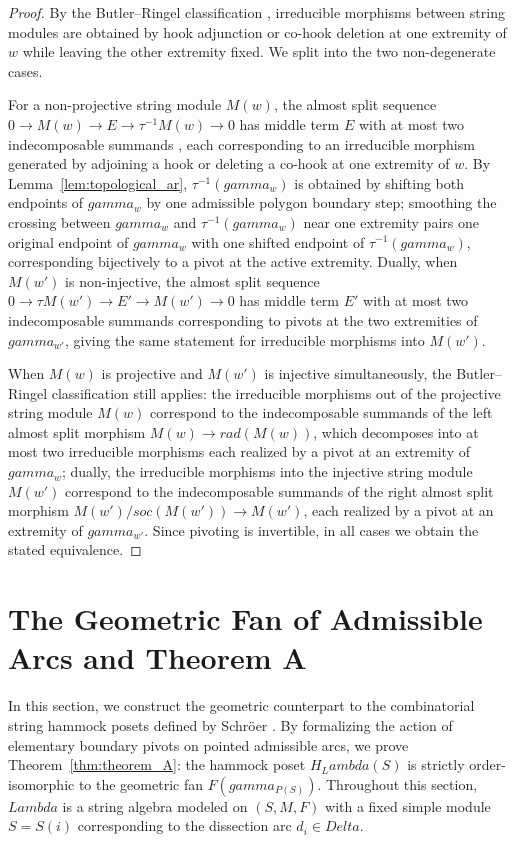 \documentclass[11pt,a4paper,reqno]{amsart}
\def\mathcal#1{#1}%
\def\mathrm#1{#1}%
\def\forb{F}%
\def\gamma{gamma}%
\def\Delta{Delta}%
\def\Lambda{Lambda}%
\theoremstyle{definition}
\theoremstyle{remark}
\newcommand{\forb}{\mathfrak{F}}
\begin{document}
\begin{proof}
By the Butler--Ringel classification \cite{ButlerRingel1987}, irreducible morphisms between string modules are obtained by hook adjunction or co-hook deletion at one extremity of $w$ while leaving the other extremity fixed. We split into the two non-degenerate cases.

For a non-projective string module $M(w)$, the almost split sequence $0 \to M(w) \to E \to \tau^{-1} M(w) \to 0$ has middle term $E$ with at most two indecomposable summands \cite{ButlerRingel1987}, each corresponding to an irreducible morphism generated by adjoining a hook or deleting a co-hook at one extremity of $w$. By Lemma~\ref{lem:topological_ar}, $\tau^{-1}(\gamma_w)$ is obtained by shifting both endpoints of $\gamma_w$ by one admissible polygon boundary step; smoothing the crossing between $\gamma_w$ and $\tau^{-1}(\gamma_w)$ near one extremity pairs one original endpoint of $\gamma_w$ with one shifted endpoint of $\tau^{-1}(\gamma_w)$, corresponding bijectively to a pivot at the active extremity. Dually, when $M(w')$ is non-injective, the almost split sequence $0 \to \tau M(w') \to E' \to M(w') \to 0$ has middle term $E'$ with at most two indecomposable summands corresponding to pivots at the two extremities of $\gamma_{w'}$, giving the same statement for irreducible morphisms into $M(w')$.

When $M(w)$ is projective and $M(w')$ is injective simultaneously, the Butler--Ringel classification still applies: the irreducible morphisms out of the projective string module $M(w)$ correspond to the indecomposable summands of the left almost split morphism $M(w) \to \mathrm{rad}(M(w))$, which decomposes into at most two irreducible morphisms each realized by a pivot at an extremity of $\gamma_w$; dually, the irreducible morphisms into the injective string module $M(w')$ correspond to the indecomposable summands of the right almost split morphism $M(w')/\mathrm{soc}(M(w')) \to M(w')$, each realized by a pivot at an extremity of $\gamma_{w'}$. Since pivoting is invertible, in all cases we obtain the stated equivalence.
\end{proof}

\vspace{-0.2em}
\section{The Geometric Fan of Admissible Arcs and Theorem A}
\label{sec:geometric_fan}

In this section, we construct the geometric counterpart to the combinatorial string hammock posets defined by Schr\"oer \cite{Schroer1999}. By formalizing the action of elementary boundary pivots on pointed admissible arcs, we prove Theorem~\ref{thm:theorem_A}: the hammock poset $H_\Lambda(S)$ is strictly order-isomorphic to the geometric fan $\mathcal{F}(\gamma_{P(S)})$. Throughout this section, $\Lambda$ is a string algebra modeled on $(\mathcal{S}, \mathcal{M}, \forb)$ with a fixed simple module $S = S(i)$ corresponding to the dissection arc $d_i \in \Delta$.
\end{document}
